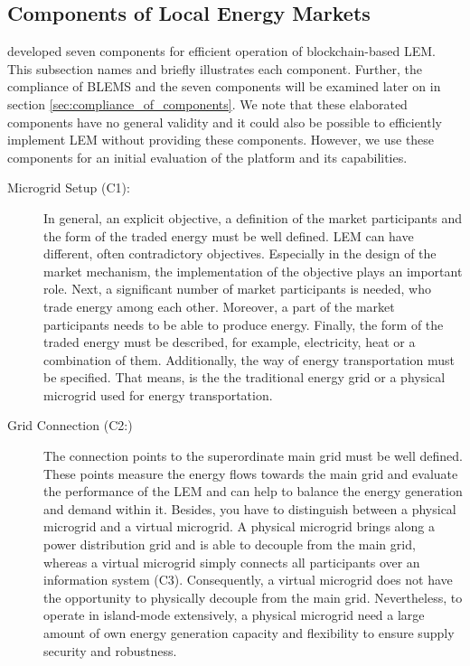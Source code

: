 \subsection{Components of Local Energy Markets}
\label{sec:components_of_local_energy_markets}
 developed seven components for efficient
operation of blockchain-based LEM. This subsection names and briefly 
illustrates each component. Further, the compliance of BLEMS and the seven components will be examined later on in section \ref{sec:compliance_of_components}.
We note that these elaborated components have no general validity and it could also be 
possible to efficiently implement LEM without providing these components. 
However, we use these components for an initial evaluation of the platform and its capabilities.

\begin{description}
    \item[Microgrid Setup (C1):] In general, an explicit objective, a definition of the market 
     participants and the form of the traded energy must be well defined. 
     LEM can have different, often contradictory objectives. Especially in the
     design of the market mechanism, the implementation of the objective plays an important role.
     Next, a significant number of market participants is needed, who trade energy among each other.
     Moreover, a part of the market participants needs to be able to produce energy. 
     Finally, the form of the traded energy must be described, for example, electricity, heat or a 
     combination of them. Additionally, the way of energy transportation must be specified.
     That means, is the the traditional energy grid or a physical microgrid used for energy transportation.
     
    
    \item[Grid Connection (C2:)] The connection points to the superordinate main grid 
     must be well defined. These points measure the energy flows towards the main grid 
     and evaluate the performance of the LEM and can help to balance the energy generation 
     and demand within it. Besides, you have to distinguish between a physical microgrid and 
     a virtual microgrid. A physical microgrid brings along a power distribution grid and is able to
     decouple from the main grid, whereas a virtual microgrid simply connects all participants over 
     an information system (C3). Consequently, a virtual microgrid does not have the opportunity
     to physically decouple from the main grid. 
     Nevertheless, to operate in island-mode extensively, a physical microgrid need a large 
     amount of own energy generation capacity and flexibility to ensure supply security and robustness.
         

\end{description}
